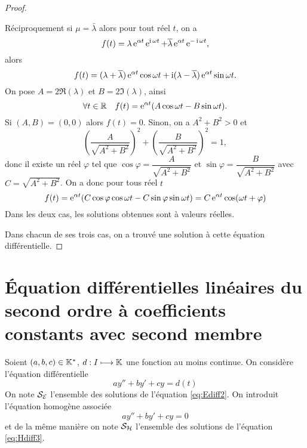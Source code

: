 \begin{proof}
\begin{itemize}
Réciproquement si $\mu=\bar{\lambda}$ alors pour tout réel $t$, on a
\begin{equation}
 f(t)=\lambda \operatorname{e}^{\alpha t} \operatorname{e}^{\operatorname{i} \omega t} + \overline{\lambda} \operatorname{e}^{\alpha t} \operatorname{e}^{-\operatorname{i}\omega t}, 
\end{equation}
alors
\begin{equation}
 f(t)=(\lambda + \overline{\lambda}) \operatorname{e}^{\alpha t} \cos \omega t + \operatorname{i}(\lambda - \overline{\lambda}) \operatorname{e}^{\alpha t}\sin \omega t. 
\end{equation}
On pose $A=2 \Re(\lambda)$ et  $B=2\Im(\lambda)$, ainsi
\begin{equation}
  \forall t \in \mathbb{R} \quad f(t)=\operatorname{e}^{\alpha t} (A \cos \omega t -B \sin \omega t).
\end{equation}
Si $(A,B)=(0,0)$ alors $f(t)=0$. Sinon, on a $A^2+B^2>0$ et 
\begin{equation}
\left(\dfrac{A}{\sqrt{A^2+B^2}} \right)^2+\left(\dfrac{B}{\sqrt{A^2+B^2}} \right)^2=1,
\end{equation}
donc il existe un réel $\varphi$ tel que $\cos \varphi=\dfrac{A}{\sqrt{A^2+B^2}}$ et $\sin \varphi = \dfrac{B}{\sqrt{A^2+B^2}}$ avec $C=\sqrt{A^2+B^2}$. On a donc pour tous réel $t$ 
\begin{equation}
f(t)=\operatorname{e}^{\alpha t} (C \cos \varphi \cos \omega t - C \sin \varphi \sin \omega t) = C \operatorname{e}^{\alpha t} \cos(\omega t + \varphi)
\end{equation}
 Dans les deux cas, les solutions obtenues sont à valeurs réelles.
  \end{itemize}
Dans chacun de ses trois cas, on a trouvé une solution à cette équation différentielle.
\end{proof}
%
\section{Équation différentielles linéaires du second ordre à coefficients constants avec second membre}
\label{sec:eqdifflinsecondordrecoefconstantsecondmembre}
Soient $(a,b,c) \in \mathbb{K}^{*}$, $d:I \longmapsto \mathbb{K}$ une fonction au moins continue. On considère l'équation différentielle
\begin{equation}
  \label{eq:Ediff2}
  ay'' + by' + cy=d(t)
\end{equation}
On note $\mathcal{S}_{\mathcal{E}}$ l'ensemble des solutions de l'équation \eqref{eq:Ediff2}. On introduit l'équation homogène associée
\begin{equation}
  \label{eq:Hdiff3}
  ay''+by'+cy=0
\end{equation}
et de la même manière on note $\mathcal{S}_{\mathcal{H}}$ l'ensemble des solutions de l'équation \eqref{eq:Hdiff3}.
